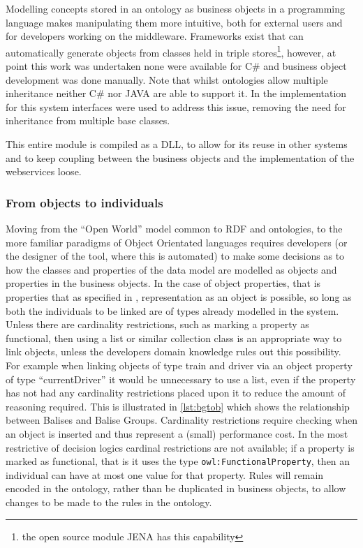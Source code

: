 Modelling concepts stored in an ontology as business objects in a programming language makes manipulating them more intuitive, both for external users and for developers working on the middleware. Frameworks exist that can automatically generate objects from classes held in triple stores\footnote{the open source module JENA has this capability}, however, at point this work was undertaken none were available for C\# and business object development was done manually. Note that whilst ontologies allow multiple inheritance neither C\# nor JAVA are able to support it. In the implementation for this system interfaces were used to address this issue, removing the need for inheritance from multiple base classes.

This entire module is compiled as a DLL, to allow for its reuse in other systems and to keep coupling between the business objects and the implementation of the webservices loose.
\subsubsection{From objects to individuals}
Moving from the ``Open World'' model common to RDF and ontologies, to the more familiar paradigms of Object Orientated languages requires developers (or the designer of the tool, where this is automated) to make some decisions as to how the classes and properties of the data model are modelled as objects and properties in the business objects. In the case of object properties, that is properties that  as specified in \citet{McGuinness04}, representation as an object is possible, so long as both the individuals to be linked are of types already modelled in the system. Unless there are cardinality restrictions, such as marking a property as functional, then using a list or similar collection class is an appropriate way to link objects, unless the developers domain knowledge rules out this possibility. For example when linking objects of type train and driver via an object property of type ``currentDriver'' it would be unnecessary to use a list, even if the property has not had any cardinality restrictions placed upon it to reduce the amount of reasoning required. This is illustrated in \autoref{lst:bgtob} which shows the relationship between Balises and Balise Groups. Cardinality restrictions require checking when an object is inserted and thus represent a (small) performance cost. In the most restrictive of decision logics cardinal restrictions are not available; if a property is marked as functional, that is it uses the type \texttt{owl:FunctionalProperty}, then an individual can have at most one value for that property. Rules will remain encoded in the ontology, rather than be duplicated in business objects, to allow changes to be made to the rules in the ontology.

